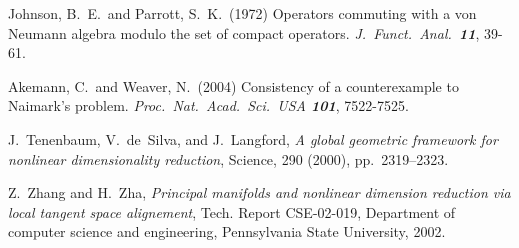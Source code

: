\documentclass{pnastwo}
\begin{document}
\begin{article}
\begin{thebibliography}{10}
Johnson, B.\ E.\ and Parrott, S.\ K.\ (1972) Operators commuting
with a von Neumann algebra modulo the set of compact operators.
{\it J.\ Funct.\ Anal.\ \bf 11}, 39-61.

Akemann, C.\ and Weaver, N.\ (2004) Consistency of a
counterexample to Naimark's problem. {\it Proc.\ Nat.\ Acad.\
Sci.\ USA \bf 101}, 7522-7525.

J.~Tenenbaum, V.~de~Silva, and J.~Langford, {\em A global geometric
  framework for nonlinear dimensionality reduction}, Science, 290 (2000),
  pp.~2319--2323.

Z.~Zhang and H.~Zha, {\em Principal manifolds and nonlinear dimension
  reduction via local tangent space alignement}, Tech. Report CSE-02-019,
  Department of computer science and engineering, Pennsylvania State
  University, 2002.
\end{thebibliography}


\end{article}
\end{document}
